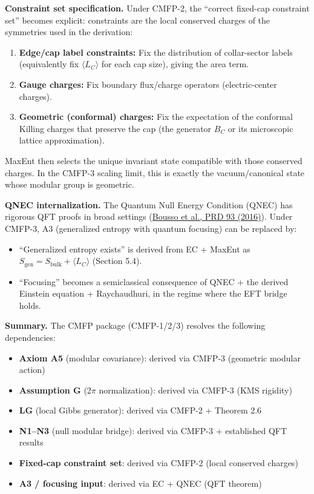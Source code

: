 \documentclass[11pt,a4paper]{article}
\theoremstyle{remark}
\providecommand{\tightlist}{%
  \setlength{\itemsep}{0pt}\setlength{\parskip}{0pt}}
\begin{document}
\textbf{Constraint set specification.} Under CMFP-2, the ``correct fixed-cap
constraint set'' becomes explicit: constraints are the local conserved charges
of the symmetries used in the derivation:

\begin{enumerate}
\def\labelenumi{\arabic{enumi}.}
\item
  \textbf{Edge/cap label constraints:} Fix the distribution of collar-sector labels
  (equivalently fix \(\langle L_C \rangle\) for each cap size), giving the area term.
\item
  \textbf{Gauge charges:} Fix boundary flux/charge operators (electric-center
  charges).
\item
  \textbf{Geometric (conformal) charges:} Fix the expectation of the conformal
  Killing charges that preserve the cap (the generator \(B_C\) or its microscopic
  lattice approximation).
\end{enumerate}

MaxEnt then selects the unique invariant state compatible with those conserved
charges. In the CMFP-3 scaling limit, this is exactly the vacuum/canonical state
whose modular group is geometric.

\textbf{QNEC internalization.} The Quantum Null Energy Condition (QNEC) has rigorous
QFT proofs in broad settings
(\href{https://arxiv.org/abs/1509.02542}{Bousso et al., PRD 93 (2016)}). Under CMFP-3,
A3 (generalized entropy with quantum focusing) can be replaced by:

\begin{itemize}
\item
  ``Generalized entropy exists'' is derived from EC + MaxEnt as
  \(S_{\mathrm{gen}} = S_{\mathrm{bulk}} + \langle L_C \rangle\) (Section 5.4).
\item
  ``Focusing'' becomes a semiclassical consequence of QNEC + the derived Einstein
  equation + Raychaudhuri, in the regime where the EFT bridge holds.
\end{itemize}

\textbf{Summary.} The CMFP package (CMFP-1/2/3) resolves the following dependencies:

\begin{itemize}
\tightlist
\item
  \textbf{Axiom A5} (modular covariance): derived via CMFP-3 (geometric modular action)
\item
  \textbf{Assumption G} (2\ensuremath{\pi} normalization): derived via CMFP-3 (KMS rigidity)
\item
  \textbf{LG} (local Gibbs generator): derived via CMFP-2 + Theorem 2.6
\item
  \textbf{N1--N3} (null modular bridge): derived via CMFP-3 + established QFT results
\item
  \textbf{Fixed-cap constraint set}: derived via CMFP-2 (local conserved charges)
\item
  \textbf{A3 / focusing input}: derived via EC + QNEC (QFT theorem)
\end{itemize}
\end{document}
